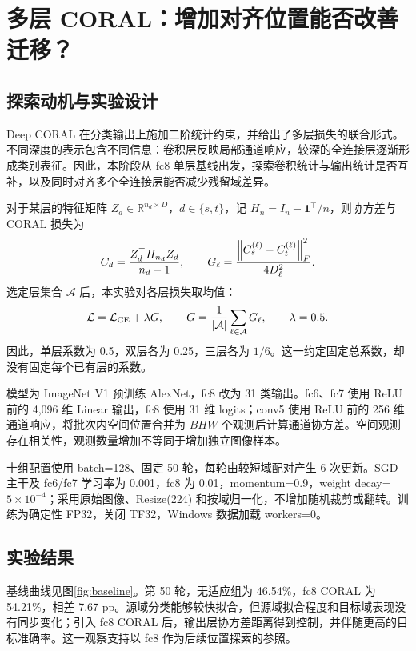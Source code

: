 \section{多层 CORAL：增加对齐位置能否改善迁移？}
\label{sec:multi}

\subsection{探索动机与实验设计}

Deep CORAL 在分类输出上施加二阶统计约束，并给出了多层损失的联合形式\cite{sun2016deep}。不同深度的表示包含不同信息：卷积层反映局部通道响应，较深的全连接层逐渐形成类别表征。因此，本阶段从 fc8 单层基线出发，探索卷积统计与输出统计是否互补，以及同时对齐多个全连接层能否减少残留域差异。

对于某层的特征矩阵 $Z_d\in\mathbb R^{n_d\times D}$，$d\in\{s,t\}$，记 $H_n=I_n-\mathbf1^\top/n$，则协方差与 CORAL 损失为
\begin{equation*}
 C_d=\frac{Z_d^\top H_{n_d}Z_d}{n_d-1},\qquad
 G_\ell=\frac{\left\lVert C_s^{(\ell)}-C_t^{(\ell)}\right\rVert_F^2}{4D_\ell^2}.
\end{equation*}
选定层集合 $\mathcal A$ 后，本实验对各层损失取均值：
\begin{equation*}
 \mathcal L=\mathcal L_{\mathrm{CE}}+\lambda G,\qquad
 G=\frac{1}{|\mathcal A|}\sum_{\ell\in\mathcal A}G_\ell,
 \qquad\lambda=0.5.
 \label{eq:multi}
\end{equation*}
因此，单层系数为 0.5，双层各为 0.25，三层各为 $1/6$。这一约定固定总系数，却没有固定每个已有层的系数。

模型为 ImageNet V1 预训练 AlexNet，fc8 改为 31 类输出。fc6、fc7 使用 ReLU 前的 4,096 维 Linear 输出，fc8 使用 31 维 logits；conv5 使用 ReLU 前的 256 维通道响应，将批次内空间位置合并为 $BHW$ 个观测后计算通道协方差。空间观测存在相关性，观测数量增加不等同于增加独立图像样本。

十组配置使用 batch=128、固定 50 轮，每轮由较短域配对产生 6 次更新。SGD 主干及 fc6/fc7 学习率为 0.001，fc8 为 0.01，momentum=0.9，weight decay=$5\times10^{-4}$；采用原始图像、Resize(224) 和按域归一化，不增加随机裁剪或翻转。训练为确定性 FP32，关闭 TF32，Windows 数据加载 workers=0。

\subsection{实验结果}

基线曲线见图\ref{fig:baseline}。第 50 轮，无适应组为 46.54\%，fc8 CORAL 为 54.21\%，相差 7.67 pp。源域分类能够较快拟合，但源域拟合程度和目标域表现没有同步变化；引入 fc8 CORAL 后，输出层协方差距离得到控制，并伴随更高的目标准确率。这一观察支持以 fc8 作为后续位置探索的参照。

